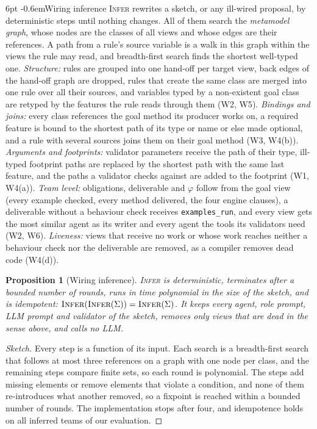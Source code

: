 \documentclass[pdflatex,sn-mathphys-num]{sn-jnl}
\makeatletter
\theoremstyle{thmstyleone}%
\newtheorem{proposition}[theorem]{Proposition}%
\theoremstyle{thmstyletwo}%
\theoremstyle{thmstylethree}%
\newcommand{\W}[1]{\textsf{W#1}}
\newcommand{\code}[1]{\texttt{#1}}
\renewcommand\paragraph{\@startsection{paragraph}{4}{\z@}%
  {6pt \@plus 2pt \@minus 1pt}{-0.6em}{\normalfont\normalsize\bfseries}}
\makeatother
\begin{document}
\paragraph{Wiring inference} \textsc{Infer} rewrites a sketch, or any
ill-wired proposal, by deterministic steps until nothing changes. All of them
search the \emph{metamodel graph}, whose nodes are the classes of all views and
whose edges are their references. A path from a rule's source variable is a
walk in this graph within the views the rule may read, and breadth-first search
finds the shortest well-typed one. \emph{Structure:} rules are grouped into one
hand-off per target view, back edges of the hand-off graph are dropped, rules
that create the same class are merged into one rule over all their sources, and
variables typed by a non-existent goal class are retyped by the features the
rule reads through them (\W{2}, \W{5}). \emph{Bindings and joins:} every class
references the goal method its producer works on, a required feature is bound to
the shortest path of its type or name or else made optional, and a rule with
several sources joins them on their goal method (\W{3}, \W{4}(b)).
\emph{Arguments and footprints:} validator parameters receive the path of their
type, ill-typed footprint paths are replaced by the shortest path with the same
last feature, and the paths a validator checks against are added to the
footprint (\W{1}, \W{4}(a)). \emph{Team level:} obligations, deliverable and
$\varphi$ follow from the goal view (every example checked, every method
delivered, the four engine clauses), a deliverable without a behaviour check
receives \code{examples\_run}, and every view gets the most similar agent as its
writer and every agent the tools its validators need (\W{2}, \W{6}).
\emph{Liveness:} views that receive no work or whose work reaches neither a
behaviour check nor the deliverable are removed, as a compiler removes dead
code (\W{4}(d)).

\begin{proposition}[Wiring inference]\label{prop:infer}
\textsc{Infer} is deterministic, terminates after a bounded number of rounds,
runs in time polynomial in the size of the sketch, and is idempotent:
$\textsc{Infer}(\textsc{Infer}(\Sigma))=\textsc{Infer}(\Sigma)$. It keeps every
agent, role prompt, LLM prompt and validator of the sketch, removes only views
that are dead in the sense above, and calls no LLM.
\end{proposition}
\begin{proof}[Sketch]
Every step is a function of its input. Each search is a breadth-first search
that follows at most three references on a graph with one node per class, and the
remaining steps compare finite sets, so each round is polynomial. The steps add
missing elements or remove elements that violate a condition, and none of them
re-introduces what another removed, so a fixpoint is reached within a bounded
number of rounds. The implementation stops after four, and idempotence holds
on all inferred teams of our evaluation.
\end{proof}
\end{document}

